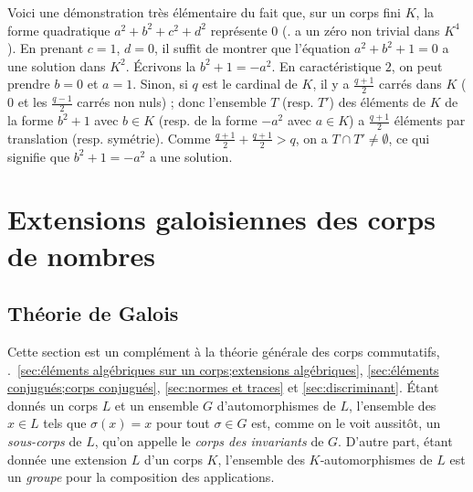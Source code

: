 \documentclass[11pt, %
  title in boldface,
  theorem in new line,
  theorem numbering = section,
  number theorems separately,
  simple name,
]{beaulivre}
\begin{document}
    \begin{remark}
        Voici une démonstration très élémentaire du fait que, sur un corps fini \( K \), la forme quadratique \( a^2+b^2+c^2+d^2 \) représente \( 0 \) (\ie. a un zéro non trivial dans \( K^4 \)). En prenant \( c = 1 \), \( d = 0 \), il suffit de montrer que l'équation \( a^2+b^2+1 = 0 \) a une solution dans \( K^2 \). Écrivons la \( b^2+1 = -a^2 \). En caractéristique \( 2 \), on peut prendre \( b = 0 \) et \( a = 1 \). Sinon, si \( q \) est le cardinal de \( K \), il y a \( \frac{q+1}{2} \) carrés dans \( K \) (\( 0 \) et les \( \frac{q-1}{2} \) carrés non nuls) ; donc l'ensemble \( T \) (resp. \( T' \)) des éléments de \( K \) de la forme \( b^2+1 \) avec \( b \in K \) (resp. de la forme \( -a^2 \) avec \( a \in K \)) a \( \frac{q+1}{2} \) éléments par translation (resp. symétrie). Comme \( \frac{q+1}{2} + \frac{q+1}{2} > q \), on a \( T \cap T' \neq \emptyset \), ce qui signifie que \( b^2+1 = -a^2 \) a une solution.
        \pushQED{\qed}\qedhere
    \end{remark}


\chapter{Extensions galoisiennes des corps de nombres}

\section{Théorie de Galois}

    Cette section est un complément à la théorie générale des corps commutatifs, \cf.~\cref{sec:éléments algébriques sur un corps;extensions algébriques}, \cref{sec:éléments conjugués;corps conjugués}, \cref{sec:normes et traces} et \cref{sec:discriminant}. Étant donnés un corps \( L \) et un ensemble \( G \) d'automorphismes de \( L \), l'ensemble des \( x \in L \) tels que \( \sigma(x) = x \) pour tout \( \sigma \in G \) est, comme on le voit aussitôt, un \emph{sous-corps} de \( L \), qu'on appelle le \emph{corps des invariants} de \( G \). D'autre part, étant donnée une extension \( L \) d'un corps \( K \), l'ensemble des \( K \)‑automorphismes de \( L \) est un \emph{groupe} pour la composition des applications.
\end{document}
